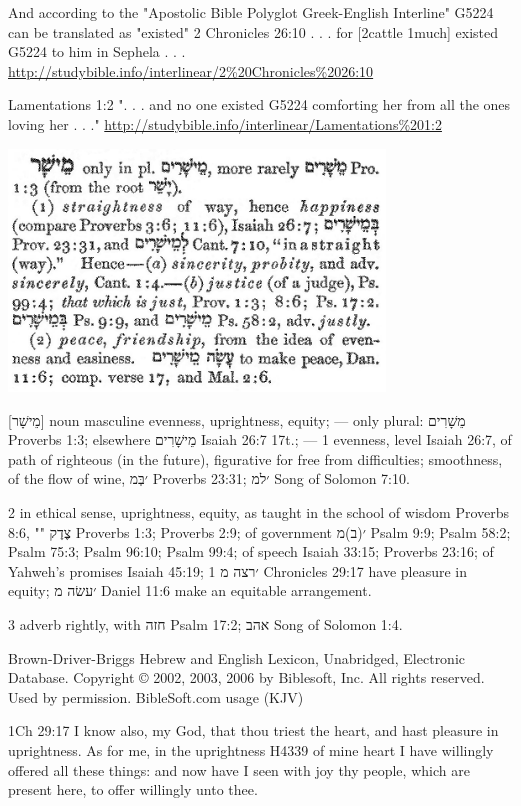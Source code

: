 \documentclass[11pt]{article}
\begin{document}
\begin{thebibliography}{37}
And according to the "Apostolic Bible Polyglot Greek-English Interline" G5224 can be translated as "existed"
2 Chronicles 26:10
. . . for [2cattle 1much] existed G5224 to him in Sephela . . .
\url{http://studybible.info/interlinear/2%20Chronicles%2026:10}

Lamentations 1:2
". . . and no one existed G5224 comforting her from all the ones loving her . . ."
\url{http://studybible.info/interlinear/Lamentations%201:2}


\includegraphics[width=10cm]{gesenius_h4339} 
 
 [מֵישָׁר]
 noun masculine evenness, uprightness, equity; — only plural: מֵשָׁרִים Proverbs 1:3; elsewhere מֵישָׁרִים Isaiah 26:7 17t.; —
1 evenness, level Isaiah 26:7, of path of righteous (in the future), figurative for free from difficulties; smoothness, of the flow of wine, ׳בְּמ Proverbs 23:31; ׳למ Song of Solomon 7:10.

2 in ethical sense, uprightness, equity, as taught in the school of wisdom Proverbs 8:6, "" צֶדֶק Proverbs 1:3; Proverbs 2:9; of government ׳(ב)מ Psalm 9:9; Psalm 58:2; Psalm 75:3; Psalm 96:10; Psalm 99:4; of speech Isaiah 33:15; Proverbs 23:16; of Yahweh's promises Isaiah 45:19; ׳רצה מ 1 Chronicles 29:17 have pleasure in equity; ׳עשׂה מ Daniel 11:6 make an equitable arrangement.

3 adverb rightly, with חזה Psalm 17:2; אהב Song of Solomon 1:4.

Brown-Driver-Briggs Hebrew and English Lexicon, Unabridged, Electronic Database.
Copyright © 2002, 2003, 2006 by Biblesoft, Inc. 
All rights reserved. Used by permission. BibleSoft.com
usage (KJV)

1Ch 29:17
I know also, my God, that thou triest the heart, and hast pleasure in uprightness. As for me, in the uprightness H4339 of mine heart I have willingly offered all these things: and now have I seen with joy thy people, which are present here, to offer willingly unto thee.


\end{thebibliography}
\end{document}
